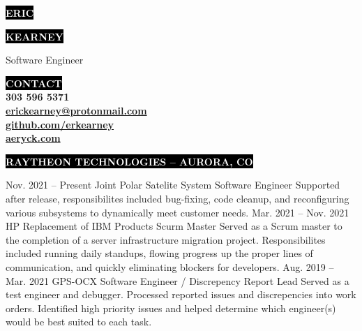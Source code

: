\documentclass[8pt]{resumeclass}
\begin{document}

\begin{minipage}[t]{0.65\textwidth}							%
	\vspace{-\baselineskip}								%

	\colorbox{black}{\huge\textcolor{white}{\textbf{\MakeUppercase{Eric}}}}

	\colorbox{black}{\huge\textcolor{white}{\textbf{\MakeUppercase{Kearney}}}}
	
	\vspace{6pt}

	{\huge Software Engineer}
\end{minipage}
\begin{minipage}[t]{0.35\textwidth}							%
	\vspace{-\baselineskip}
	\vspace{15pt}
	\colorbox{black}{\textcolor{white}{\textbf{\MakeUppercase{Contact}}}}\\
	{\textbf{303 596 5371}}\\
	{\href{mailto:erickearney@protonmail.com}{\textbf{erickearney@protonmail.com}}}\\
	{\href{https://github.com/erkearney}{\textbf{github.com/erkearney}}}\\
	{\href{https://aeryck.com}{\textbf{aeryck.com}}}
\end{minipage}

\vspace{3pt}


\colorbox{black}{\small\textcolor{white}{\textbf{\MakeUppercase{Raytheon Technologies -- Aurora, CO}}}}
\vspace{6pt}

\begin{entrylist}
	\entry
		{Nov. 2021 -- Present}
		{Joint Polar Satelite System}
		{Software Engineer}
		{Supported after release, responsibilites included bug-fixing, code cleanup, and reconfiguring various subsystems to dynamically meet customer needs.}
	\entry
		{Mar. 2021 -- Nov. 2021}
		{HP Replacement of IBM Products}
		{Scurm Master}
		{Served as a Scrum master to the completion of a server infrastructure migration project. Responsibilites included running daily standups, flowing progress up the proper lines of communication, and quickly eliminating blockers for developers.}
	\entry
		{Aug. 2019 -- Mar. 2021}
		{GPS-OCX}
		{Software Engineer / Discrepency Report Lead}
		{Served as a test engineer and debugger. Processed reported issues and discrepencies into work orders. Identified high priority issues and helped determine which engineer(s) would be best suited to each task.}
\end{entrylist}
\end{document}
